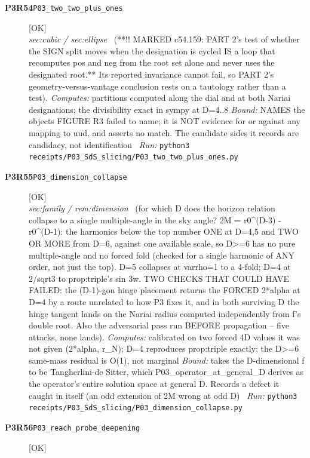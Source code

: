 \begin{description}
\item[\textbf{P3R54}\quad\texttt{P03\_two\_two\_plus\_ones}]\hfill\textsf{[OK]}\\
\textit{sec:cubic / sec:ellipse} \ (**!! MARKED c54.159: PART 2's test of whether the SIGN split moves when the designation is cycled IS a loop that recomputes pos and neg from the root set alone and never uses the designated root.** Its reported invariance cannot fail, so PART 2's geometry-versus-vantage conclusion rests on a tautology rather than a test). 
\emph{Computes:} partitions computed along the dial and at both Nariai designations; the divisibility exact in sympy at D=4..8
 \emph{Bound:} NAMES the objects FIGURE R3 failed to name; it is NOT evidence for or against any mapping to uud, and asserts no match. The candidate sides it records are candidacy, not identification
\ \emph{Run:} \texttt{python3 receipts/P03\_SdS\_slicing/P03\_two\_two\_plus\_ones.py}
\item[\textbf{P3R55}\quad\texttt{P03\_dimension\_collapse}]\hfill\textsf{[OK]}\\
\textit{sec:family / rem:dimension} \ (for which D does the horizon relation collapse to a single multiple-angle in the sky angle? 2M = r0\textasciicircum{}(D-3) - r0\textasciicircum{}(D-1): the harmonics below the top number ONE at D=4,5 and TWO OR MORE from D=6, against one available scale, so D>=6 has no pure multiple-angle and no forced fold (checked for a single harmonic of ANY order, not just the top). D=5 collapses at varrho=1 to a 4-fold; D=4 at 2/sqrt3 to prop:triple's sin 3w. TWO CHECKS THAT COULD HAVE FAILED: the (D-1)-gon hinge placement returns the FORCED 2*alpha at D=4 by a route unrelated to how P3 fixes it, and in both surviving D the hinge tangent lands on the Nariai radius computed independently from f's double root. Also the adversarial pass run BEFORE propagation -- five attacks, none lands). 
\emph{Computes:} calibrated on two forced 4D values it was not given (2*alpha, r\_N); D=4 reproduces prop:triple exactly; the D>=6 same-mass residual is O(1), not marginal
 \emph{Bound:} takes the D-dimensional f to be Tangherlini-de Sitter, which P03\_operator\_at\_general\_D derives as the operator's entire solution space at general D. Records a defect it caught in itself (an odd extension of 2M wrong at odd D)
\ \emph{Run:} \texttt{python3 receipts/P03\_SdS\_slicing/P03\_dimension\_collapse.py}
\item[\textbf{P3R56}\quad\texttt{P03\_reach\_probe\_deepening}]\hfill\textsf{[OK]}\\

\end{description}
